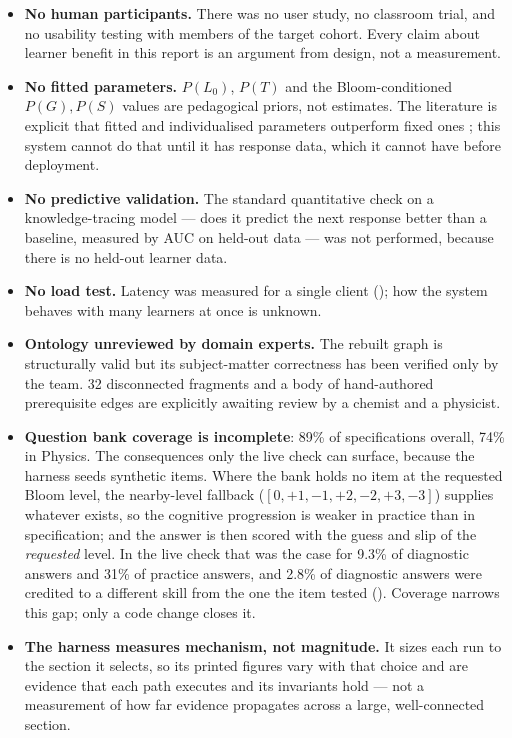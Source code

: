 \begin{itemize}
  \item \textbf{No human participants.} There was no user study, no classroom
    trial, and no usability testing with members of the target cohort. Every
    claim about learner benefit in this report is an argument from design, not a
    measurement.
  \item \textbf{No fitted parameters.} $P(L_0)$, $P(T)$ and the Bloom-conditioned
    $P(G), P(S)$ values are pedagogical priors, not estimates. The literature is
    explicit that fitted and individualised parameters outperform fixed ones
    \cite{yudelson2013individualized,baker2008more}; this system cannot do that
    until it has response data, which it cannot have before deployment.
  \item \textbf{No predictive validation.} The standard quantitative check on a
    knowledge-tracing model --- does it predict the next response better than a
    baseline, measured by AUC on held-out data --- was not performed, because
    there is no held-out learner data.
  \item \textbf{No load test.} Latency was measured for a single client
    (); how the system behaves with many learners at once is
    unknown.
  \item \textbf{Ontology unreviewed by domain experts.} The rebuilt graph is
    structurally valid but its subject-matter correctness has been verified only
    by the team. 32 disconnected fragments and a body of hand-authored
    prerequisite edges are explicitly awaiting review by a chemist and a
    physicist.
  \item \textbf{Question bank coverage is incomplete}: 89\% of specifications
    overall, 74\% in Physics. The consequences only the live check can surface,
    because the harness seeds synthetic items. Where the bank holds no item at
    the requested Bloom level, the nearby-level fallback
    ($[0,+1,-1,+2,-2,+3,-3]$) supplies whatever exists, so the cognitive
    progression is weaker in practice than in specification; and the answer is
    then scored with the guess and slip of the \emph{requested} level. In the
    live check that was the case for 9.3\% of diagnostic answers and 31\% of
    practice answers, and 2.8\% of diagnostic answers were credited to a
    different skill from the one the item tested
    (). Coverage narrows this gap; only a code
    change closes it.
  \item \textbf{The harness measures mechanism, not magnitude.} It sizes each
    run to the section it selects, so its printed figures vary with that choice
    and are evidence that each path executes and its invariants hold --- not a
    measurement of how far evidence propagates across a large, well-connected
    section.
\end{itemize}

